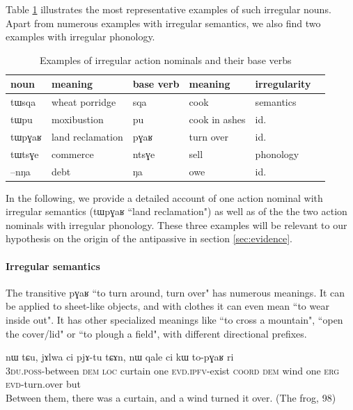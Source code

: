 \documentclass[oldfontcommands,oneside,a4paper,11pt]{article}
\newcommand{\ipa}[1]{{\phon \mbox{#1}}} %
\begin{document}
Table \ref{tab:irr.act.nmlz} illustrates the most representative examples of such irregular nouns. Apart from numerous examples with irregular semantics, we also find two examples with irregular phonology. 

\begin{table}[H]
\caption{Examples of irregular action nominals and their base verbs} \label{tab:irr.act.nmlz}
\begin{tabular}{llllll}
\toprule
 noun & meaning &base verb & meaning& irregularity\\
\midrule
\ipa{tɯsqa}   &wheat porridge& \ipa{sqa} & cook & semantics \\
\ipa{tɯpu}   &moxibustion& \ipa{pu} & cook in ashes &id.\\
\ipa{tɯpɣaʁ}   &land reclamation& \ipa{pɣaʁ} & turn over &id.\\
\midrule
\ipa{tɯtsɣe}&commerce & \ipa{ntsɣe} & sell & phonology\\
\ipa{--nŋa}   &debt& \ipa{ŋa} & owe &id.\\
\bottomrule
\end{tabular}
\end{table}

In the following, we provide a detailed account of one action nominal with irregular semantics (\ipa{tɯpɣaʁ}   ``land reclamation") as well as of the the two action nominals with irregular phonology. These three examples will be relevant to our hypothesis on the origin of the antipassive in section \ref{sec:evidence}.

\paragraph{Irregular semantics}

The transitive  \ipa{pɣaʁ} ``to turn around, turn over" has numerous meanings. It can be applied to sheet-like objects, and with clothes it can even mean ``to wear inside out". It has other specialized meanings like ``to cross a mountain", ``open the cover/lid" or ``to plough a field", with different directional prefixes.
 
   \begin{exe} \label{ex:topGaR}
\ex
\gll  \ipa{ndʑi-phɤrthɤβ}    	\ipa{nɯ}    	\ipa{tɕu,}    	\ipa{jɤlwa}    	\ipa{ci}    	\ipa{pjɤ-tu}    	\ipa{tɕɤn,}    	\ipa{nɯ}    	\ipa{qale}    	\ipa{ci}    	\ipa{kɯ}    	\ipa{to-pɣaʁ}    \ipa{ri} \\
\textsc{3du.poss}-between \textsc{dem} \textsc{loc} curtain one \textsc{evd.ipfv}-exist \textsc{coord} \textsc{dem} wind one \textsc{erg} \textsc{evd}-turn.over but \\
 \glt  Between them, there was a curtain, and a wind turned it over. (The frog, 98)
\end{exe} 
\end{document}
